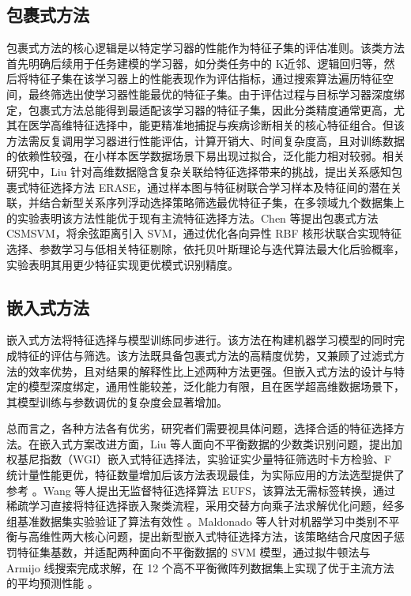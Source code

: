 \documentclass{wzuthesis}
\begin{document}
\subsection{包裹式方法}
包裹式方法的核心逻辑是以特定学习器的性能作为特征子集的评估准则。该类方法首先明确后续用于任务建模的学习器，如分类任务中的 K近邻、逻辑回归等，然后将特征子集在该学习器上的性能表现作为评估指标，通过搜索算法遍历特征空间，最终筛选出使学习器性能最优的特征子集。由于评估过程与目标学习器深度绑定，包裹式方法总能得到最适配该学习器的特征子集，因此分类精度通常更高，尤其在医学高维特征选择中，能更精准地捕捉与疾病诊断相关的核心特征组合。但该方法需反复调用学习器进行性能评估，计算开销大、时间复杂度高，且对训练数据的依赖性较强，在小样本医学数据场景下易出现过拟合，泛化能力相对较弱。相关研究中，Liu 针对高维数据隐含复杂关联给特征选择带来的挑战，提出关系感知包裹式特征选择方法 ERASE，通过样本图与特征树联合学习样本及特征间的潜在关联，并结合新型关系序列浮动选择策略筛选最优特征子集，在多领域九个数据集上的实验表明该方法性能优于现有主流特征选择方法。Chen 等提出包裹式方法 CSMSVM，将余弦距离引入 SVM，通过优化各向异性 RBF 核形状联合实现特征选择、参数学习与低相关特征剔除，依托贝叶斯理论与迭代算法最大化后验概率，实验表明其用更少特征实现更优模式识别精度。

\subsection{嵌入式方法}
嵌入式方法将特征选择与模型训练同步进行。该方法在构建机器学习模型的同时完成特征的评估与筛选。该方法既具备包裹式方法的高精度优势，又兼顾了过滤式方法的效率优势，且对结果的解释性比上述两种方法更强。但嵌入式方法的设计与特定的模型深度绑定，通用性能较差，泛化能力有限，且在医学超高维数据场景下，其模型训练与参数调优的复杂度会显著增加。

总而言之，各种方法各有优劣，研究者们需要视具体问题，选择合适的特征选择方法。在嵌入式方案改进方面，Liu 等人面向不平衡数据的少数类识别问题，提出加权基尼指数（WGI）嵌入式特征选择法，实验证实少量特征筛选时卡方检验、F 统计量性能更优，特征数量增加后该方法表现最佳，为实际应用的方法选型提供了参考 。Wang 等人提出无监督特征选择算法 EUFS，该算法无需标签转换，通过稀疏学习直接将特征选择嵌入聚类流程，采用交替方向乘子法求解优化问题，经多组基准数据集实验验证了算法有效性 。Maldonado 等人针对机器学习中类别不平衡与高维性两大核心问题，提出新型嵌入式特征选择方法，该策略结合尺度因子惩罚特征集基数，并适配两种面向不平衡数据的 SVM 模型，通过拟牛顿法与 Armijo 线搜索完成求解，在 12 个高不平衡微阵列数据集上实现了优于主流方法的平均预测性能 。
\end{document}
